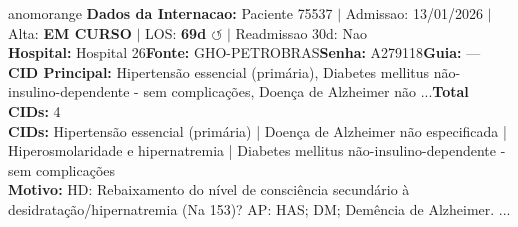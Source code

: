 \documentclass[a4paper,10pt]{article}
\begin{document}
\newpage

\begin{anomalycard}[Internacao 161824 | GHO-PETROBRAS | ALTO (z=4.96)]{anomorange}
\textbf{Dados da Internacao:} Paciente 75537 $\mid$ Admissao: 13/01/2026 $\mid$ Alta: \textcolor{anomorange}{\textbf{EM CURSO}} $\mid$ LOS: \textbf{69d \textcolor{anomorange}{$\circlearrowleft$}} $\mid$ Readmissao 30d: Nao\\
\textbf{Hospital:} Hospital 26\quad\textbf{Fonte:} GHO-PETROBRAS\quad\textbf{Senha:} A279118\quad\textbf{Guia:} ---\\
\textbf{CID Principal:} {\small Hipertensão essencial (primária), Diabetes mellitus não-insulino-dependente - sem complicações, Doença de Alzheimer não ...}\quad\textbf{Total CIDs:} 4\\

\textbf{CIDs:} {\scriptsize Hipertensão essencial (primária) | Doença de Alzheimer não especificada | Hiperosmolaridade e hipernatremia | Diabetes mellitus não-insulino-dependente - sem complicações}\\

\textbf{Motivo:} {\scriptsize HD: Rebaixamento do nível de consciência secundário à desidratação/hipernatremia (Na 153)?  AP: HAS; DM; Demência de Alzheimer. ...}\\


\end{anomalycard}
\end{document}
